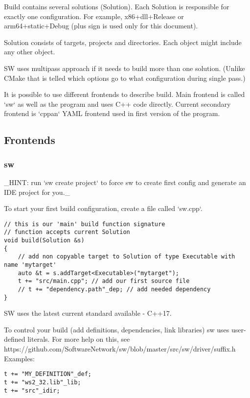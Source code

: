 Build contains several solutions (Solution).
Each Solution is responsible for exactly one configuration. For example, x86+dll+Release or arm64+static+Debug (plus sign is used only for this document).

Solution consists of targets, projects and directories. Each object might include any other object.

SW uses multipass approach if it needs to build more than one solution.
(Unlike CMake that is telled which options go to what configuration during single pass.)

It is possible to use different frontends to describe build.
Main frontend is called `sw` as well as the program and uses C++ code directly.
Current secondary frontend is `cppan` YAML frontend used in first version of the program.

\subsection{Frontends}

\subsubsection{sw}

_HINT: run `sw create project` to force sw to create first config and generate an IDE project for you._

To start your first build configuration, create a file called `sw.cpp`.

\begin{verbatim}
// this is our 'main' build function signature
// function accepts current Solution
void build(Solution &s)
{
    // add non copyable target to Solution of type Executable with name 'mytarget'
    auto &t = s.addTarget<Executable>("mytarget");
    t += "src/main.cpp"; // add our first source file
    // t += "dependency.path"_dep; // add needed dependency
}
\end{verbatim}

SW uses the latest current standard available - C++17.

To control your build (add definitions, dependencies, link libraries) sw uses user-defined literals. For more help on this, see https://github.com/SoftwareNetwork/sw/blob/master/src/sw/driver/suffix.h
Examples:

\begin{verbatim}
t += "MY_DEFINITION"_def;
t += "ws2_32.lib"_lib;
t += "src"_idir;
\end{verbatim}

